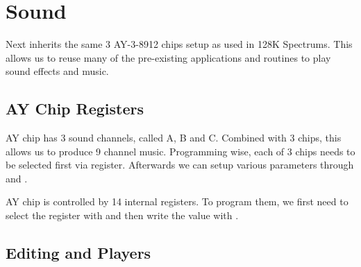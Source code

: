 \section{Sound}
\label{zx_next_sound}


Next inherits the same 3 AY-3-8912 chips setup as used in 128K Spectrums. This allows us to reuse many of the pre-existing applications and routines to play sound effects and music.

\subsection{AY Chip Registers}

AY chip has 3 sound channels, called A, B and C. Combined with 3 chips, this allows us to produce 9 channel music. Programming wise, each of 3 chips needs to be selected first via  register. Afterwards we can setup various parameters through  and .

AY chip is controlled by 14 internal registers. To program them, we first need to select the register with  and then write the value with .


\subsection{Editing and Players}

